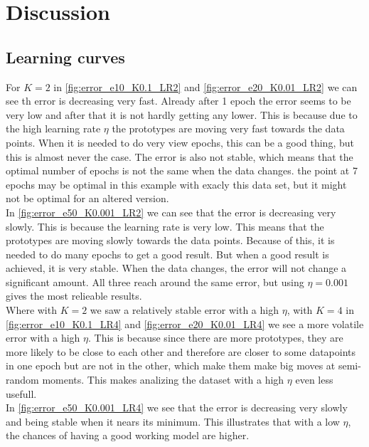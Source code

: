 \documentclass[twoside, a4paper, fleqn, reqno]{article}
\begin{document}
\section{Discussion}

\subsection*{Learning curves}

For $K=2$ in \autoref{fig:error_e10_K0.1_LR2} and \autoref{fig:error_e20_K0.01_LR2}
we can see th error is decreasing very fast. Already after 1 epoch the error seems
to be very low and after that it is not hardly getting any lower. This is because
due to the high learning rate $\eta$ the prototypes are moving very fast towards the data points.
When it is needed to do very view epochs, this can be a good thing, but this is almost never the case.
The error is also not stable, which means that the optimal number of epochs is not the same when the data changes.
the point at 7 epochs may be optimal in this example with exacly this data set, but it might not be optimal for an altered version. \\

In \autoref{fig:error_e50_K0.001_LR2} we can see that the error is decreasing very slowly.
This is because the learning rate is very low. This means that the prototypes are moving slowly towards the data points.
Because of this, it is needed to do many epochs to get a good result. But when a good result is achieved, it is very stable.
When the data changes, the error will not change a significant amount.
All three reach around the same error, but using $\eta=0.001$ gives the most relieable results. \\

Where with $K=2$ we saw a relatively stable error with a high $\eta$, with $K=4$ in
\autoref{fig:error_e10_K0.1_LR4} and \autoref{fig:error_e20_K0.01_LR4} we see a more volatile error with a high $\eta$.
This is because since there are more prototypes, they are more likely to be close to each other and therefore are closer to some datapoints
in one epoch but are not in the other, which make them make big moves at semi-random moments.
This makes analizing the dataset with a high $\eta$ even less usefull. \\

In \autoref{fig:error_e50_K0.001_LR4} we see that the error is decreasing very slowly and being stable when it nears its minimum.
This illustrates that with a low $\eta$, the chances of having a good working model are higher.
\end{document}
